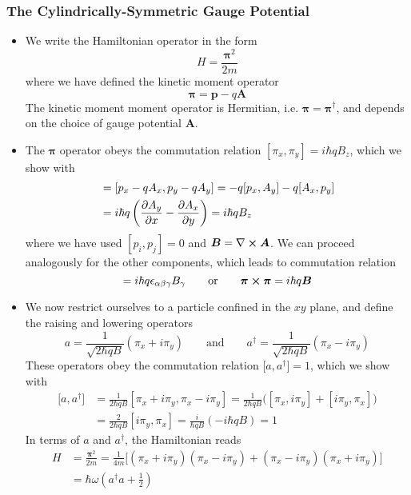 \documentclass[11pt, a4paper]{article}
\renewcommand{\curl}{\nabla \cross}
\newcommand{\eqtext}[1]{\qquad \text{#1} \qquad}
\newcommand{\Ham}{Hamiltonian\xspace}
\newcommand{\Herm}{Hermitian\xspace}
\renewcommand{\vec}[1]{\bm{#1}}  %
\newcommand{\A}{\vec{A}}  %
\newcommand{\B}{\vec{B}}  %
\begin{document}
\subsubsection{The Cylindrically-Symmetric Gauge Potential}
\begin{itemize}
	\item We write the \Ham operator in the form
	\begin{equation*}
		H = \frac{\vec{\pi}^{2}}{2m}
	\end{equation*}
	where we have defined the kinetic moment operator 
	\begin{equation*}
		\vec{\pi} = \vec{p} - q \A
	\end{equation*}
	The kinetic moment moment operator is \Herm, i.e. $ \vec{\pi} = \vec{\pi}^{\dagger} $, and depends on the choice of gauge potential $ \A $. 
	
	\item The $ \vec{\pi} $ operator obeys the commutation relation $ [\pi_{x}, \pi_{y}] = i \hbar q B_{z} $, which we show with
	\begin{align*}
		[\pi_{x}, \pi_{y}] & = [p_{x} - qA_{x}, p_{y} - qA_{y}] = -q[p_{x}, A_{y}] - q[A_{x}, p_{y}] \\
		& = i\hbar q \left(\pdv{A_{y}}{x} - \pdv{A_{x}}{y}\right) = i \hbar q B_{z}
	\end{align*}
	where we have used $ [p_{i}, p_{j}] = 0 $ and $ \B = \curl 
	\A $. We can proceed analogously for the other components, which leads to commutation relation 
	\begin{equation*}
		[\pi_{\alpha}, \pi_{\beta}] = i \hbar q \epsilon_{\alpha \beta \gamma} B_{\gamma} \eqtext{or} \vec{\pi} \cross \vec{\pi} = i \hbar q \B
	\end{equation*}
	
	\item We now restrict ourselves to a particle confined in the $ xy $ plane, and define the raising and lowering operators
	\begin{equation*}
		a = \frac{1}{\sqrt{2 \hbar q B}} (\pi_{x} + i \pi_{y}) \eqtext{and} a^{\dagger} = \frac{1}{\sqrt{2 \hbar q B}} (\pi_{x} - i \pi_{y})
	\end{equation*}
	These operators obey the commutation relation $ \big[a, a^{\dagger}\big] = 1 $, which we show with
	\begin{align*}
		\big[a, a^{\dagger}\big] &= \frac{1}{2\hbar q B}[\pi_{x} + i\pi_{y}, \pi_{x} - i \pi_{y}] = \frac{1}{2\hbar q B}\big([\pi_{x}, i\pi_{y}] + [i\pi_{y}, \pi_{x}]\big) \\
		& = \frac{2}{2\hbar q B}[i \pi_{y}, \pi_{x}] = \frac{i}{\hbar q B} (-i\hbar q B) = 1
	\end{align*}
	In terms of $ a $ and $ a^{\dagger} $, the Hamiltonian reads
	\begin{align*}
		H &= \frac{\vec{\pi}^{2}}{2m} = \frac{1}{4m} \big[(\pi_{x} + i \pi_{y})(\pi_{x} - i \pi_{y}) + (\pi_{x} - i \pi_{y})(\pi_{x} + i \pi_{y})\big]\\
		& = \hbar \omega \left(a^{\dagger}a + \frac{1}{2}\right)
	\end{align*}
	

\end{itemize}
\end{document}
